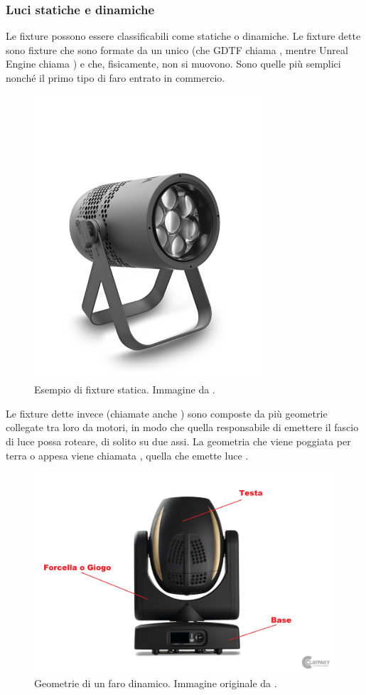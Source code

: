 \documentclass[main.tex]{subfiles}
\begin{document}
\subsubsection{Luci statiche e dinamiche}\label{subsec:1_1_fixtureTypes}
Le fixture possono essere classificabili come statiche o dinamiche. Le fixture dette  sono fixture che sono formate da un unico  (che GDTF chiama , mentre Unreal Engine chiama ) e che, fisicamente, non si muovono. Sono quelle più semplici nonché il primo tipo di faro entrato in commercio.
\begin{figure}[H]
    \centering
    \includegraphics[width=0.36\linewidth]{img/introduzione/staticFixtureExample.jpg}
    \caption{Esempio di fixture statica. Immagine da \cite{fig_1_fixtureStatic}.}
    \label{fig:1_staticFixture}
\end{figure}
\noindent Le fixture dette invece  (chiamate anche ) sono composte da più geometrie collegate tra loro da motori, in modo che quella responsabile di emettere il fascio di luce possa roteare, di solito su due assi. La geometria che viene poggiata per terra o appesa viene chiamata , quella che emette luce .
\begin{figure}[H]
    \centering
    \includegraphics[width=0.65\linewidth]{img/introduzione/dynamicFixtureAnatomy.jpg}
    \caption{Geometrie di un faro dinamico. Immagine originale da \cite{fig_1_xtylos}.}
    \label{fig:1_DynamicFixture}
\end{figure}
\end{document}

